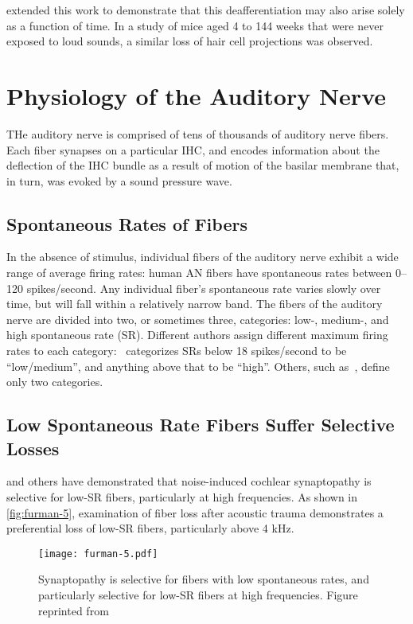 \cite{Sergeyenko2013AgeRelated} extended this work to demonstrate that this deafferentiation may also arise solely as a function of time.  In a study of mice aged 4 to 144 weeks that were never exposed to loud sounds, a similar loss of hair cell projections was observed.


\section{Physiology of the Auditory Nerve} %
\label{sec:physiology_of_the_auditory_nerve}
THe auditory nerve is comprised of tens of thousands of auditory nerve fibers.  Each fiber synapses on a particular IHC, and encodes information about the deflection of the IHC bundle as a result of motion of the basilar membrane that, in turn, was evoked by a sound pressure wave.
\subsection{Spontaneous Rates of Fibers} %
\label{sub:spontaneous_rates_of_fibers}
In the absence of stimulus, individual fibers of the auditory nerve exhibit a wide range of average firing rates: human AN fibers have spontaneous rates between 0--120 spikes/second.  Any individual fiber's spontaneous rate varies slowly over time, but will fall within a relatively narrow band.  The fibers of the auditory nerve are divided into two, or sometimes three, categories: low-, medium-, and high spontaneous rate (SR).  Different authors assign different maximum firing rates to each category:~\cite{Temchin2008Threshold} categorizes SRs below 18 spikes/second to be ``low/medium'', and anything above that to be ``high''.  Others, such as~\cite{Liberman1978AuditoryNerve}, define only two categories.  
\subsection{Low Spontaneous Rate Fibers Suffer Selective Losses} %
\label{sub:low_spontaneous_rate_fibers_suffer_selective_losses}
\cite{Furman2013NoiseInduced} and others have demonstrated that noise-induced cochlear synaptopathy is selective for low-SR fibers, particularly at high frequencies.  As shown in \autoref{fig:furman-5}, examination of fiber loss after acoustic trauma demonstrates a preferential loss of low-SR fibers, particularly above 4 kHz.  

\begin{figure}[htbp]
	\centering
	\texttt{[image: furman-5.pdf]}
	\caption[Synaptopathy is Selective]{Synaptopathy is selective for fibers with low spontaneous rates, and particularly selective for low-SR fibers at high frequencies. Figure reprinted from~\cite{Furman2013NoiseInduced}}
	\label{fig:furman-5}
\end{figure}

